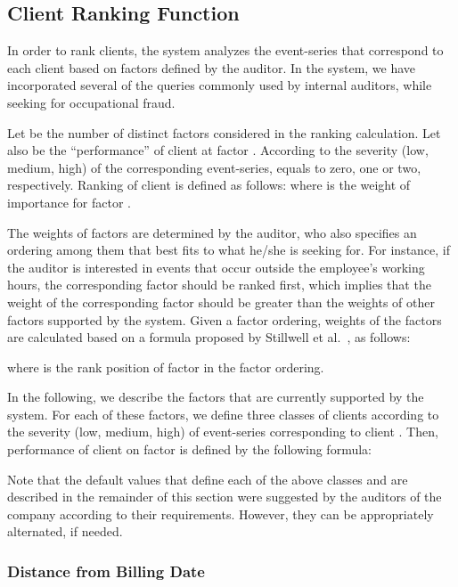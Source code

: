 \documentclass[conference]{IEEEtran}
\begin{document}
\subsection{Client Ranking Function}
\label{sec:client-ranking}

In order to rank clients, the system analyzes the event-series that
correspond to each client based on factors defined by the auditor.
In the system, we have incorporated several of the queries commonly
used by internal auditors, while seeking for occupational fraud.

Let  be the number of distinct factors considered in the ranking
calculation. Let also  be the ``performance'' of client 
at factor . According to the severity (low, medium, high) of the
corresponding event-series,  equals to zero, one or two,
respectively. Ranking  of client  is defined as follows:
 where  is the weight of importance
for factor .

The weights of factors  are determined by the
auditor, who also specifies an ordering among them that best fits to
what he/she is seeking for. For instance, if the auditor is
interested in events that occur outside the employee's working
hours, the corresponding factor should be ranked first, which
implies that the weight of the corresponding factor should be
greater than the weights of other factors supported by the system.
Given a factor ordering, weights  of the factors
are calculated based on a formula proposed by Stillwell et
al.~\cite{SSE81}, as follows:

where  is the rank position of factor  in the factor
ordering.

In the following, we describe the factors that are currently
supported by the system. For each of these factors, we define three
classes of clients according to the severity (low, medium, high) of
event-series  corresponding to client . Then, performance
 of client  on factor  is defined by the following
formula:

   

Note that the default values that define each of the above classes
and are described in the remainder of this section were suggested by
the auditors of the company according to their requirements.
However, they can be appropriately alternated, if needed.


\subsubsection{Distance from Billing Date}
\end{document}
